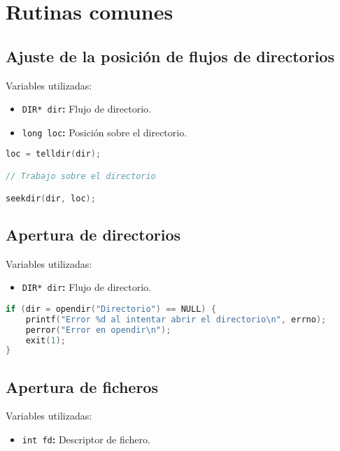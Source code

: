 \chapter{Rutinas comunes}

\section{Ajuste de la posición de flujos de directorios}

Variables utilizadas:

\begin{itemize}
	\item\texttt{DIR* dir}\textbf{:} Flujo de directorio.
	\item\texttt{long loc}\textbf{:} Posición sobre el directorio.
\end{itemize}

\begin{lstlisting}[language=C]
loc = telldir(dir);

// Trabajo sobre el directorio

seekdir(dir, loc);
\end{lstlisting}

\section{Apertura de directorios}

Variables utilizadas:

\begin{itemize}
	\item\texttt{DIR* dir}\textbf{:} Flujo de directorio.
\end{itemize}

\begin{lstlisting}[language=C]
if (dir = opendir("Directorio") == NULL) {
	printf("Error %d al intentar abrir el directorio\n", errno);
	perror("Error en opendir\n");
	exit(1);
}
\end{lstlisting}

\section{Apertura de ficheros}

Variables utilizadas:

\begin{itemize}
	\item\texttt{int fd}\textbf{:} Descriptor de fichero.
\end{itemize}

